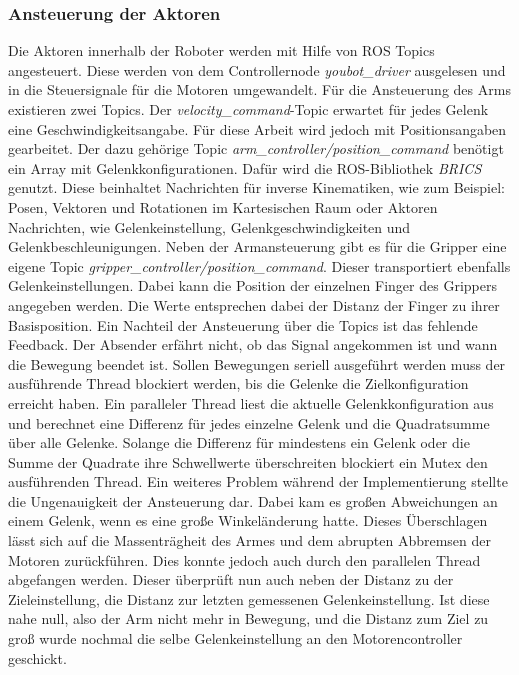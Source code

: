 \subsubsection{Ansteuerung der Aktoren}
Die Aktoren innerhalb der Roboter werden mit Hilfe von ROS Topics angesteuert. Diese werden von dem Controllernode \textit{youbot\_driver} ausgelesen und in die Steuersignale für die Motoren umgewandelt. Für die Ansteuerung des Arms existieren zwei Topics. Der \textit{velocity\_command}-Topic erwartet für jedes Gelenk eine Geschwindigkeitsangabe. Für diese Arbeit wird jedoch mit Positionsangaben gearbeitet. Der dazu gehörige Topic \textit{arm\_controller/position\_command} benötigt ein Array mit Gelenkkonfigurationen. Dafür wird die ROS-Bibliothek \textit{BRICS} genutzt. Diese beinhaltet Nachrichten für inverse Kinematiken, wie zum  Beispiel: Posen, Vektoren und Rotationen im Kartesischen Raum oder Aktoren Nachrichten, wie Gelenkeinstellung, Gelenkgeschwindigkeiten und Gelenkbeschleunigungen. Neben der Armansteuerung gibt es für die Gripper eine eigene Topic \textit{gripper\_controller/position\_command}. Dieser transportiert ebenfalls Gelenkeinstellungen. Dabei kann die Position der einzelnen Finger des Grippers angegeben werden. Die Werte entsprechen dabei der Distanz der Finger zu ihrer Basisposition. Ein Nachteil der Ansteuerung über die Topics ist das fehlende Feedback. Der Absender erfährt nicht, ob das Signal angekommen ist und wann die Bewegung beendet ist. Sollen Bewegungen seriell ausgeführt werden muss der ausführende Thread blockiert werden, bis die Gelenke die Zielkonfiguration erreicht haben.  Ein paralleler Thread liest die aktuelle Gelenkkonfiguration aus und berechnet eine Differenz für jedes einzelne Gelenk und die Quadratsumme über alle Gelenke. Solange die Differenz für mindestens ein Gelenk oder die Summe der Quadrate ihre Schwellwerte überschreiten blockiert ein Mutex den ausführenden Thread. Ein weiteres Problem während der Implementierung stellte die Ungenauigkeit der Ansteuerung dar. Dabei kam es großen Abweichungen an einem Gelenk, wenn es eine große Winkeländerung hatte. Dieses Überschlagen lässt sich auf die Massenträgheit des Armes und dem abrupten Abbremsen der Motoren zurückführen. Dies konnte jedoch auch durch den parallelen Thread abgefangen werden. Dieser überprüft nun auch neben der Distanz zu der Zieleinstellung, die Distanz zur letzten gemessenen Gelenkeinstellung. Ist diese nahe null, also der Arm nicht mehr in Bewegung, und die Distanz zum Ziel zu groß wurde nochmal die selbe Gelenkeinstellung an den Motorencontroller geschickt.

